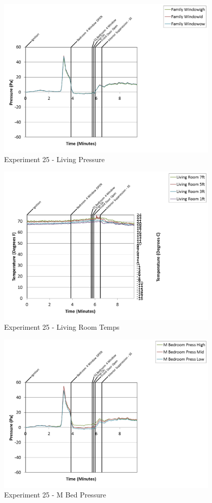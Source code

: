 \documentclass{article}
\begin{document}
\begin{appendices}
\begin{figure}[h!]
	\centering
	\includegraphics[height=3.05in]{0_Images/Results_Charts/Exp_25_Charts/LivingPressure.png}
	\caption{Experiment 25 - Living Pressure}
\end{figure}

\clearpage

\begin{figure}[h!]
	\centering
	\includegraphics[height=3.05in]{0_Images/Results_Charts/Exp_25_Charts/LivingRoomTemps.png}
	\caption{Experiment 25 - Living Room Temps}
\end{figure}


\begin{figure}[h!]
	\centering
	\includegraphics[height=3.05in]{0_Images/Results_Charts/Exp_25_Charts/MBedPressure.png}
	\caption{Experiment 25 - M Bed Pressure}
\end{figure}


\end{appendices}
\end{document}
